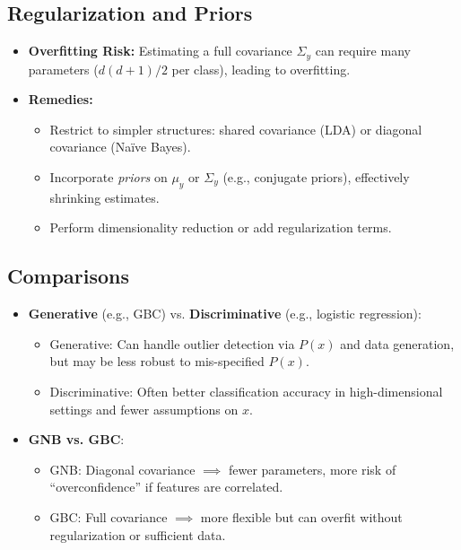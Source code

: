 \documentclass[twocolumn]{article}
\begin{document}
\begin{spacing}{1}
\subsection{Regularization and Priors}
\begin{itemize}
    \item \textbf{Overfitting Risk:} Estimating a full covariance $\Sigma_y$ can require many parameters ($d(d+1)/2$ per class), leading to overfitting.
    \item \textbf{Remedies:}
    \begin{itemize}
        \item Restrict to simpler structures: shared covariance (LDA) or diagonal covariance (Na\"ive Bayes).
        \item Incorporate \emph{priors} on $\mu_y$ or $\Sigma_y$ (e.g., conjugate priors), effectively shrinking estimates.
        \item Perform dimensionality reduction or add regularization terms.
    \end{itemize}
\end{itemize}

\subsection{Comparisons}
\begin{itemize}
    \item \textbf{Generative} (e.g., GBC) vs. \textbf{Discriminative} (e.g., logistic regression):
    \begin{itemize}
        \item Generative: Can handle outlier detection via $P(x)$ and data generation, but may be less robust to mis-specified $P(x)$.
        \item Discriminative: Often better classification accuracy in high-dimensional settings and fewer assumptions on $x$.
    \end{itemize}
    \item \textbf{GNB vs. GBC}:
    \begin{itemize}
        \item GNB: Diagonal covariance \(\implies\) fewer parameters, more risk of “overconfidence” if features are correlated.
        \item GBC: Full covariance \(\implies\) more flexible but can overfit without regularization or sufficient data.
    \end{itemize}
\end{itemize}


\end{spacing}
\end{document}
